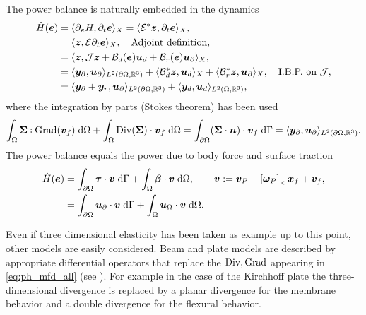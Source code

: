 The power balance is naturally embedded in the dynamics 
\begin{equation}
\begin{aligned}
\dot{H}(\bm{e}) &= \langle \partial_{\bm{e}} H, \partial_t {\bm{e}} \rangle_{X} = \langle \mathcal{E}^* \bm{z}, \partial_t {\bm{e}} \rangle_{X}, \\
&= \langle \bm{z}, \mathcal{E} \partial_t {\bm{e}} \rangle_{X}, \quad \text{Adjoint definition}, \\
& = \langle \bm{z}, \mathcal{J}\bm{z} + \mathcal{B}_d(\bm{e}) \bm{u}_d + \mathcal{B}_r(\bm{e}) \bm{u}_\partial \rangle_{X}, \\
& = \langle \bm{y}_\partial,  \bm{u}_\partial \rangle_{L^2(\partial\Omega, \mathbb{R}^3)} + \langle \mathcal{B}_d^* \bm{z}, \bm{u}_d \rangle_{X} + \langle \mathcal{B}_r^* \bm{z}, \bm{u}_\partial \rangle_{X}, \quad \text{I.B.P. on } \mathcal{J}, \\
&= \langle \bm{y}_\partial + \bm{y}_r,  \bm{u}_\partial \rangle_{L^2(\partial\Omega, \mathbb{R}^3)} + \langle \bm{y}_d,  \bm{u}_d \rangle_{L^2(\Omega, \mathbb{R}^3)}, \\
\end{aligned}
\end{equation}
where the integration by parts (Stokes theorem) has been used
\begin{equation}
\label{eq:stokes}
\int_{\Omega} \bm\Sigma \cddot \Grad(\bm{v}_f) \d{\Omega} + \int_{\Omega} \Div(\bm\Sigma) \cdot \bm{v}_f \d{\Omega} = \int_{\partial \Omega} (\bm\Sigma \cdot \bm{n}) \cdot \bm{v}_f \d{\Gamma} = \langle \bm{y}_\partial,  \bm{u}_\partial \rangle_{L^2(\partial\Omega, \bbR^3)}.
\end{equation}
The power balance equals the power due to body force and surface traction
\begin{equation}
\begin{aligned}
\dot{H}(\bm{e}) &= \int_{\partial \Omega} \bm{\tau} \cdot \bm{v} \d\Gamma + \int_{\Omega} \bm{\beta} \cdot \bm{v}  \d{\Omega}, \qquad \bm{v} := \bm{v}_P + \crmat{\bm{\omega}_P} \bm{x}_f + {\bm{v}}_f,\\
&= \int_{\partial \Omega} \bm{u}_\partial \cdot \bm{v} \d\Gamma + \int_{\Omega} \bm{u}_\Omega \cdot \bm{v}  \d{\Omega}.
\end{aligned}
\end{equation}

\begin{remark}
	Even if three dimensional elasticity has been taken as example up to this point, other models are easily considered. Beam and plate models are described by appropriate differential operators that replace the $\operatorname*{Div}, \operatorname*{Grad}$ appearing in \eqref{eq:ph_mfd_all} (see ). {For example in the case of the Kirchhoff plate the three-dimensional divergence is replaced by a planar divergence  for the membrane behavior and a double divergence for the flexural behavior.}
\end{remark}


